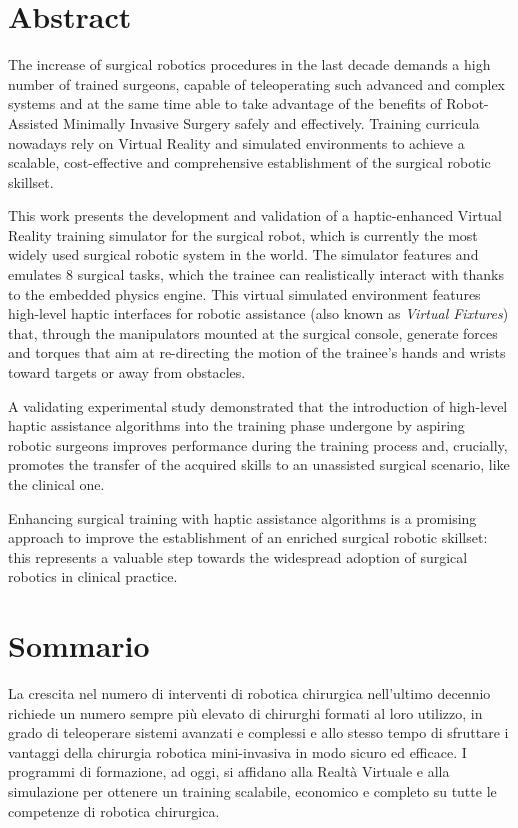 \documentclass[../main.tex]{subfiles}
\begin{document}
\chapter*{Abstract}
The increase of surgical robotics procedures in the last decade demands a high number of trained surgeons, capable of teleoperating such advanced and complex systems and at the same time able to take advantage of the benefits of Robot-Assisted Minimally Invasive Surgery safely and effectively. Training curricula nowadays rely on Virtual Reality and simulated environments to achieve a scalable, cost-effective and comprehensive establishment of the surgical robotic skillset.

This work presents the development and validation of a haptic-enhanced Virtual Reality training simulator for the \davinci surgical robot, which is currently the most widely used surgical robotic system in the world. The simulator features and emulates 8 surgical tasks, which the trainee can realistically interact with thanks to the embedded physics engine. This virtual simulated environment features high-level haptic interfaces for robotic assistance (also known as \textit{Virtual Fixtures}) that, through the manipulators mounted at the surgical console, generate forces and torques that aim at re-directing the motion of the trainee's hands and wrists toward targets or away from obstacles. 

A validating experimental study demonstrated that the introduction of high-level haptic assistance algorithms into the training phase undergone by aspiring robotic surgeons improves performance during the training process and, crucially, promotes the transfer of the acquired skills to an unassisted surgical scenario, like the clinical one. 

Enhancing surgical training with haptic assistance algorithms is a promising approach to improve the establishment of an enriched surgical robotic skillset: this represents a valuable step towards the widespread adoption of surgical robotics in clinical practice.

\newpage\newpage
{}
\chapter*{Sommario}
La crescita nel numero di interventi di robotica chirurgica nell'ultimo decennio richiede un numero sempre più elevato di chirurghi formati al loro utilizzo, in grado di teleoperare sistemi avanzati e complessi e allo stesso tempo di sfruttare i vantaggi della chirurgia robotica mini-invasiva in modo sicuro ed efficace. I programmi di formazione, ad oggi, si affidano alla Realtà Virtuale e alla simulazione per ottenere un training scalabile, economico e completo su tutte le competenze di robotica chirurgica.
\end{document}
